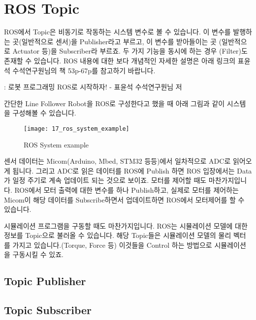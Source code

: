\documentclass[11pt,fleqn]{book} %
\begin{document}
\section{ROS Topic}

ROS에서 Topic은 비동기로 작동하는 시스템 변수로 볼 수 있습니다. 이 변수를 발행하는 곳(일반적으로 센서)을 Publisher라고 부르고,
이 변수를 받아들이는 곳 (일반적으로 Actuator 등)을 Subscriber라 부르죠. 두 가지 기능을 동시에 하는 경우 (Filter)도 존재할 수 있습니다.
ROS 내용에 대한 보다 개념적인 자세한 설명은 아래 링크의 표윤석 수석연구원님의 책 53p-67p를 참고하기 바랍니다.

\begin{link}
  : 로봇 프로그래밍 ROS로 시작하자! - 표윤석 수석연구원님 저
\end{link}

간단한 Line Follower Robot을 ROS로 구성한다고 했을 때 아래 그림과 같이 시스템을 구성해볼 수 있습니다.

\begin{figure}[h]
\centering\texttt{[image: 17\_ros\_system\_example]}
\caption{ROS System example}
\end{figure}

센서 데이터는 Micom(Arduino, Mbed, STM32 등등)에서 일차적으로 ADC로 읽어오게 됩니다. 그리고 ADC로 읽은 데이터를 ROS에 Publish 하면 ROS 입장에서는 Data가 일정 주기로 계속 업데이트 되는 것으로 보이죠.
모터를 제어할 때도 마찬가지입니다. ROS에서 모터 출력에 대한 변수를 하나 Publish하고, 실제로 모터를 제어하는 Micom이 해당 데이터를 Subscribe하면서 업데이트하면 ROS에서 모터제어를 할 수 있습니다.

시뮬레이션 프로그램을 구동할 때도 마찬가지입니다. ROS는 시뮬레이션 모델에 대한 정보를 Topic으로 불러올 수 있습니다.
해당 Topic들은 시뮬레이션 모델의 물리 벡터를 가지고 있습니다.(Torque, Force 등)
이것들을 Control 하는 방법으로 시뮬레이션을 구동시킬 수 있죠.


\subsection{Topic Publisher}

\subsection{Topic Subscriber}
\end{document}
